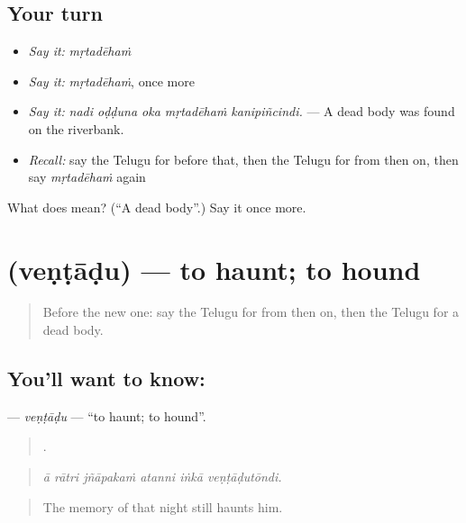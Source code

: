 \subsection*{Your turn}
\begin{itemize}
\raggedright
  \item \emph{Say it:} \emph{mṛtadēhaṁ}
  \item \emph{Say it:} \emph{mṛtadēhaṁ}, once more
  \item \emph{Say it:} \emph{nadi oḍḍuna oka mṛtadēhaṁ kanipiñcindi.} — A dead body was found on the riverbank.
  \item \emph{Recall:} say the Telugu for before that, then the Telugu for from then on, then say \emph{mṛtadēhaṁ} again
\end{itemize}

\begin{tcolorbox}[breakable,colback=teal!4,colframe=teal!35!black,title={Before you move on}]
What does  mean? (\textquotedblleft{}A dead body\textquotedblright{}.) Say it once more.
\end{tcolorbox}
\section[\texorpdfstring{\te{వెంటాడు} (veṇṭāḍu)}{వెంటాడు (veṇṭāḍu)}]{ (veṇṭāḍu) — to haunt; to hound}

\label{lesson:TE-C380-ventadu}



\begin{quote}
Before the new one: say the Telugu for from then on, then the Telugu for a dead body.
\end{quote}

\subsection*{You'll want to know: }
\textbf{} — \emph{veṇṭāḍu} — \textquotedblleft{}to haunt; to hound\textquotedblright{}.

\begin{quote}
     .
\end{quote}

\begin{quote}
\emph{ā rātri jñāpakaṁ atanni iṅkā veṇṭāḍutōndi.}
\end{quote}

\begin{quote}
The memory of that night still haunts him.
\end{quote}

